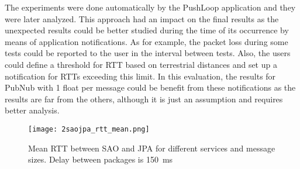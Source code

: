 The experiments were done automatically by the PushLoop application and they were later analyzed.
This approach had an impact on the final results as the unexpected results could be better studied during the time of its occurrence by means of application notifications.
As for example, the packet loss during some tests could be reported to the user in the interval between tests.
Also, the users could define a threshold for RTT based on terrestrial distances and set up a notification for RTTs exceeding this limit.
In this evaluation, the results for PubNub with 1 float per message could be benefit from these notifications as the results are far from the others, although it is just an assumption and requires better analysis.

\begin{figure}[!ht]
	\centering
	\texttt{[image: 2saojpa\_rtt\_mean.png]}
	\caption{Mean RTT between SAO and JPA for different services and message sizes. Delay between packages is 150~ms}
	\label{fig:second-sao-jpa-rtt}
\end{figure}

